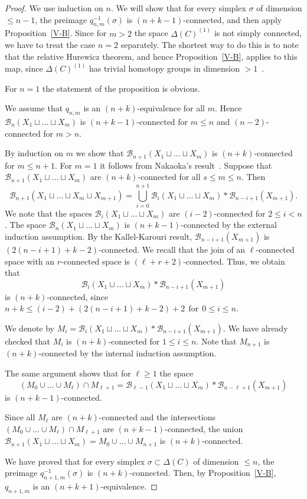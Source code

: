 \documentclass{amsart}
\numberwithin{equation}{section}
\theoremstyle{plain}
\theoremstyle{definition}
\begin{document}
\begin{proof}
We use induction on $n$. We will show that for every simplex $\sigma$  of dimension $\le n-1$, the preimage $q_{n,m}^{-1}(\sigma)$ is $(n+k-1)$-connected, and then apply Proposition~\ref{V-B}. Since for $m>2$ the space $\Delta(C)^{(1)}$ is not simply connected, we have to treat the case $n=2$ separately.  
The shortest way to do this is to note that the relative Hurewicz theorem, and hence Proposition~\ref{V-B}, applies to this map, since $\Delta(C)^{(1)}$ has trivial homotopy groups in dimension $>1$~\cite{Ha}.

For $n=1$ the statement of the proposition is obvious.


We assume that $q_{n,m}$ is an $(n+k)$-equivalence for all $m$. Hence
$\mathcal  B_n(X_1\sqcup\dots\sqcup X_m)$ is $(n+k-1)$-connected for $m\le n$ and $(n-2)$-connected for $m>n$.

By induction on $m$ we show that $\mathcal  B_{n+1}(X_1\sqcup\dots\sqcup X_m)$  is $(n+k)$-connected for $m\le n+1$.
For $m=1$ it follows from Nakaoka's result~\cite{Na}. 
Suppose that $\mathcal  B_{n+1}(X_1\sqcup\dots\sqcup X_m)$ are $(n+k)$-connected for all $s\le m\le n$.
Then $$\mathcal  B_{n+1}(X_1\sqcup\dots\sqcup X_m\sqcup X_{m+1})=\bigcup_{i=0}^{n+1}\mathcal  B_{i}(X_1\sqcup\dots\sqcup X_m)\ast \mathcal  B_{n-i+1}(X_{m+1}).$$
We note that the spaces
$\mathcal  B_{i}(X_1\sqcup\dots\sqcup X_m)$  are $(i-2)$-connected for $2\le i<n$.  The space $\mathcal  B_n(X_1\sqcup\dots\sqcup X_m)$ is $(n+k-1)$-connected
by the external induction assumption.
By  the Kallel-Karouri result,   $\mathcal  B_{n-i+1}(X_{m+1})$ is $(2(n-i+1)+k-2)$-connected. We recall that the join of an $\ell$-connected space with an $r$-connected space is $(\ell+r+2)$-connected.
Thus, we obtain that $$\mathcal  B_{i}(X_1\sqcup\dots\sqcup X_m)\ast \mathcal  B_{n-i+1}(X_{m+1})$$ is $(n+k)$-connected, since
$n+k\le (i-2)+(2(n-i+1)+k-2)+2\ \ \text{for}\ \ 0\le i\le n$.


We denote by  $M_i=\mathcal  B_{i}(X_1\sqcup\dots\sqcup X_m)\ast \mathcal  B_{n-i+1}(X_{m+1})$.  We have already checked that $M_i$ is $(n+k)$-connected for $1\le i\le  n$. Note that
$M_{n+1}$ is $(n+k)$-connected by the internal induction assumption. 


The same argument shows that for $\ell\ge 1$ the space
$$(M_0\cup\dots\cup M_\ell)\cap M_{\ell+1}=\mathcal  B_{\ell-1}(X_1\sqcup\dots\sqcup X_m)\ast \mathcal  B_{n-\ell+1}(X_{m+1})$$ is $(n+k-1)$-connected. 


Since all $M_\ell$ are  $(n+k)$-connected and the intersections  $(M_0\cup\dots\cup M_\ell)\cap M_{\ell+1}$ are $( n+k-1)$-connected, the union $\mathcal  B_{n+1}(X_1\sqcup\dots\sqcup X_m)=M_0\cup\dots\cup M_{n+1}$ is $(n+k)$-connected.

 We have proved that for every simplex $\sigma\subset\Delta(C)$ of dimension $\le n$, the preimage
$q_{n+1,m}^{-1}(\sigma)$ is $(n+k)$-connected. Then, by Proposition~\ref{V-B},  $q_{n+1,m}$ is an $(n+k+1)$-equivalence.
\end{proof}
 
\end{document}
